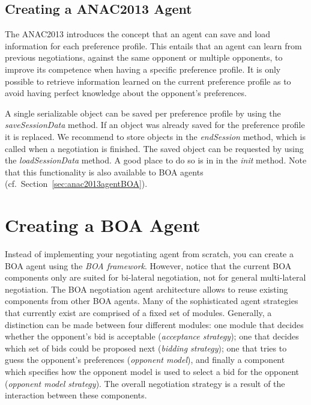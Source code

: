 \documentclass[]{article}
\begin{document}
\subsection{Creating a ANAC2013 Agent}\label{sec:anac2013agent}
The ANAC2013 introduces the concept that an agent can save and load information for each preference profile. This entails that an agent can learn from previous negotiations, against the same opponent or multiple opponents, to improve its competence when having a specific preference profile. It is only possible to retrieve information learned on the current preference profile as to avoid having perfect knowledge about the opponent's preferences.

A single serializable object can be saved per preference profile by using the \textit{saveSessionData} method. If an object was already saved for the preference profile it is replaced. We recommend to store objects in the \textit{endSession} method, which is called when a negotiation is finished. The saved object can be requested by using the \textit{loadSessionData} method. A good place to do so is in in the \textit{init} method. Note that this functionality is also available to BOA agents (cf.\ Section~\ref{sec:anac2013agentBOA}).


\section{Creating a BOA Agent}\label{sec:boa}
Instead of implementing your negotiating agent from scratch, you can create a BOA agent using the \textit{BOA framework}. However, notice that the current BOA components only are suited for bi-lateral negotiation, not for general multi-lateral negotiation.
The BOA negotiation agent architecture allows to reuse existing components from other BOA agents. Many of the sophisticated agent strategies that currently exist are comprised of a fixed set of modules. Generally, a distinction can be made between four different modules: one module that decides whether the opponent's bid is acceptable (\textit{acceptance strategy}); one that decides which set of bids could be proposed next (\textit{bidding strategy}); one that tries to guess the opponent's preferences (\textit{opponent model}), and finally a component which specifies how the opponent model is used to select a bid for the opponent (\textit{opponent model strategy}). The overall negotiation strategy is a result of the interaction between these components.
\end{document}
